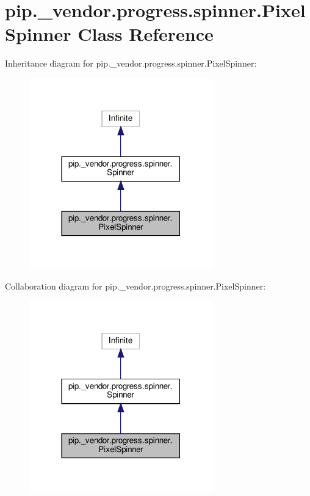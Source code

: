 \hypertarget{classpip_1_1__vendor_1_1progress_1_1spinner_1_1PixelSpinner}{}\section{pip.\+\_\+vendor.\+progress.\+spinner.\+Pixel\+Spinner Class Reference}
\label{classpip_1_1__vendor_1_1progress_1_1spinner_1_1PixelSpinner}


Inheritance diagram for pip.\+\_\+vendor.\+progress.\+spinner.\+Pixel\+Spinner\+:
\nopagebreak
\begin{figure}[H]
\begin{center}
\leavevmode
\includegraphics[width=225pt]{classpip_1_1__vendor_1_1progress_1_1spinner_1_1PixelSpinner__inherit__graph}
\end{center}
\end{figure}


Collaboration diagram for pip.\+\_\+vendor.\+progress.\+spinner.\+Pixel\+Spinner\+:
\nopagebreak
\begin{figure}[H]
\begin{center}
\leavevmode
\includegraphics[width=225pt]{classpip_1_1__vendor_1_1progress_1_1spinner_1_1PixelSpinner__coll__graph}
\end{center}
\end{figure}
